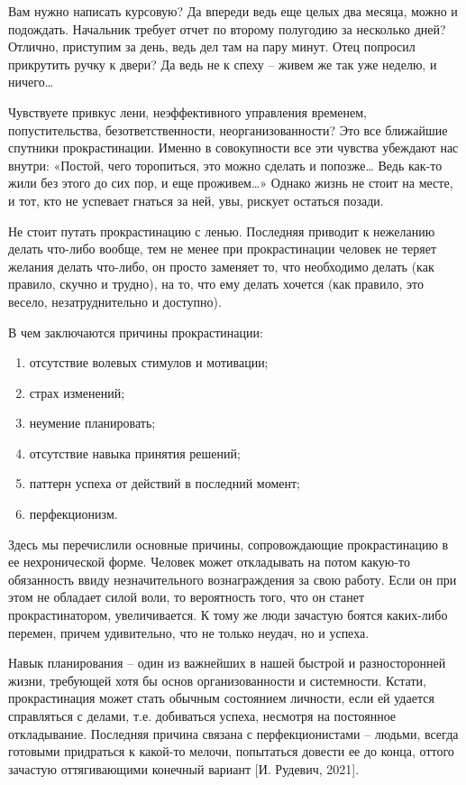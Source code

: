 Вам нужно написать курсовую? Да впереди ведь еще целых два месяца, можно и подождать. Начальник требует отчет по второму полугодию за несколько дней? Отлично, приступим за день, ведь дел там на пару минут. Отец попросил прикрутить ручку к двери? Да ведь не к спеху – живем же так уже неделю, и ничего…

Чувствуете привкус лени, неэффективного управления временем, попустительства, безответственности, неорганизованности? Это все ближайшие спутники прокрастинации. Именно в совокупности все эти чувства убеждают нас внутри: «Постой, чего торопиться, это можно сделать и попозже… Ведь как-то жили без этого до сих пор, и еще проживем…» Однако жизнь не стоит на месте, и тот, кто не успевает гнаться за ней, увы, рискует остаться позади.

Не стоит путать прокрастинацию с ленью. Последняя приводит к нежеланию делать что-либо вообще, тем не менее при прокрастинации человек не теряет желания делать что-либо, он просто заменяет то, что необходимо делать (как правило, скучно и трудно), на то, что ему делать хочется (как правило, это весело, незатруднительно и доступно).

В чем заключаются причины прокрастинации:

\begin{enumerate}
    \item отсутствие волевых стимулов и мотивации;
    \item страх изменений;
    \item неумение планировать;
    \item отсутствие навыка принятия решений;
    \item паттерн успеха от действий в последний момент;
    \item перфекционизм.
\end{enumerate}

Здесь мы перечислили основные причины, сопровождающие прокрастинацию в ее нехронической форме. Человек может откладывать на потом какую-то обязанность ввиду незначительного вознаграждения за свою работу. Если он при этом не обладает силой воли, то вероятность того, что он станет прокрастинатором, увеличивается. К тому же люди зачастую боятся каких-либо перемен, причем удивительно, что не только неудач, но и успеха.

Навык планирования – один из важнейших в нашей быстрой и разносторонней жизни, требующей хотя бы основ организованности и системности. Кстати, прокрастинация может стать обычным состоянием личности, если ей удается справляться с делами, т.е. добиваться успеха, несмотря на постоянное откладывание. Последняя причина связана с перфекционистами – людьми, всегда готовыми придраться к какой-то мелочи, попытаться довести ее до конца, оттого зачастую оттягивающими конечный вариант [И. Рудевич, 2021].

